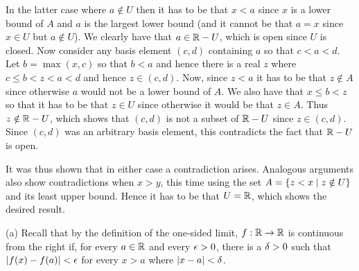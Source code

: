 {{    In the latter case where $a \notin U$ then it has to be that $x < a$ since $x$ is a lower bound of $A$ and $a$ is the largest lower bound (and it cannot be that $a = x$ since $x \in U$ but $a \notin U$).
    We clearly have that $a \in {\mathbb{R}} - U$, which is open since $U$ is closed.
    Now consider any basis element $(c,d)$ containing $a$ so that $c < a < d$.
    Let $b = \max(x,c)$ so that $b < a$ and hence there is a real $z$ where $c \leq b < z < a < d$ and hence $z \in (c,d)$.
    Now, since $z < a$ it has to be that $z \notin A$ since otherwise $a$ would not be a lower bound of $A$.
    We also have that $x \leq b < z$ so that it has to be that $z \in U$ since otherwise it would be that $z \in A$.
    Thus $z \notin {\mathbb{R}} - U$, which shows that $(c,d)$ is not a subset of ${\mathbb{R}} - U$ since $z \in (c,d)$.
    Since $(c,d)$ was an arbitrary basis element, this contradicts the fact that ${\mathbb{R}} - U$ is open.

    It was thus shown that in either case a contradiction arises.
    Analogous arguments also show contradictions when $x > y$, this time using the set $A = \left\{ z < x \mid z \notin U \right\}$ and its least upper bound.
    Hence it has to be that $U = {\mathbb{R}}$, which shows the desired result.
  }

  \mainprob
  
  (a) Recall that by the definition of the one-sided limit, $f: {\mathbb{R}} \to {\mathbb{R}}$ is continuous from the right if, for every $a \in {\mathbb{R}}$ and every $\epsilon > 0$, there is a $\delta > 0$ such that $\left| f(x) - f(a) \right| < \epsilon$ for every $x > a$ where $\left| x-a \right| < \delta$.

}
